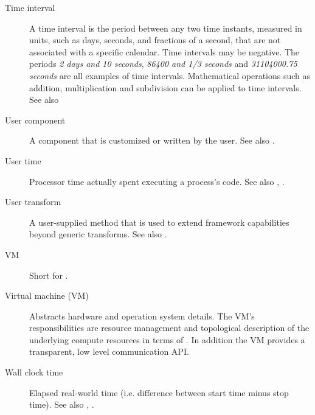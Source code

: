 \begin{description}
\item [Time interval] \label{glos:TimeInterval} A time interval is the
  period between any two time instants, measured in units, such as days, 
  seconds, and fractions of a second, that are not associated with a specific
  calendar.  Time intervals may be negative.  The periods \emph{2 days and 10 seconds}, 
  \emph{86400 and 1/3 seconds} and \emph{31104000.75 seconds} are all examples of time intervals.  
  Mathematical operations such as addition, multiplication and subdivision 
  can be applied to time intervals. See also 

\item[User component] \label{UserComp} A component that is customized or
  written by the user.  See also .

\item[User time] \label{UserTime} Processor time actually spent executing 
  a process's code. See also , 
  .

\item[User transform] \label{glos:UserTrans} A user-supplied 
  method that is used to extend framework capabilities beyond generic 
  transforms. See also . 

\item[VM] \label{glos:VM} Short for 
  .

\item[Virtual machine (VM)] \label{glos:VMachine} Abstracts hardware and 
  operation system details. The VM's responsibilities are resource management
  and topological description of the underlying compute resources in terms of 
  . In addition the VM provides a transparent, low level
  communication API. 

\item [Wall clock time] \label{WallClockTime} Elapsed real-world time 
  (i.e. difference between start time minus stop time).
  See also , .

\end{description}








































